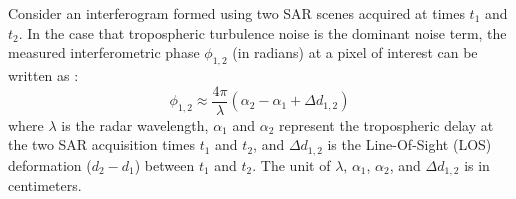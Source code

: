 \documentclass{utexasthesis}
\begin{document}

Consider an interferogram formed using two SAR scenes acquired at times $t_1$ and $t_2$. In the case that tropospheric turbulence noise is the dominant noise term, the measured interferometric phase $\phi_{1,2}$ (in radians) at a pixel of interest can be written as \cite{Zebker1997AtmosphericEffectsInterferometric}:
\begin{equation}
\phi_{1,2} \approx \frac{4 \pi}{\lambda} \left(\alpha_2 - \alpha_1 + \Delta d_{1,2} \right)
\end{equation}
where $ \lambda $ is the radar wavelength, $\alpha_1$ and $\alpha_2$ represent the tropospheric delay at the two SAR acquisition times $t_1$ and $t_2$, and $\Delta d_{1,2} $ is the Line-Of-Sight (LOS) deformation ($d_2-d_1$) between $t_1$ and $t_2$. The unit of $\lambda$, $\alpha_1$, $\alpha_2$, and $\Delta d_{1,2} $ is in centimeters. 
\end{document}
